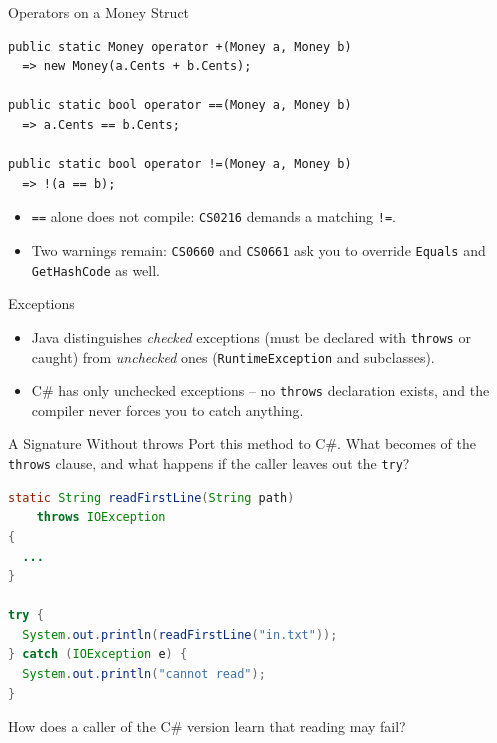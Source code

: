 \begin{solutionframe}{Operators on a Money Struct}
  \begin{lstlisting}[basicstyle=\scriptsize\ttfamily]
public static Money operator +(Money a, Money b)
  => new Money(a.Cents + b.Cents);

public static bool operator ==(Money a, Money b)
  => a.Cents == b.Cents;

public static bool operator !=(Money a, Money b)
  => !(a == b);
  \end{lstlisting}
  \begin{itemize}
    \item \texttt{==} alone does not compile: \texttt{CS0216} demands a matching
      \texttt{!=}.
    \item Two warnings remain: \texttt{CS0660} and \texttt{CS0661} ask you to
      override \texttt{Equals} and \texttt{GetHashCode} as well.
  \end{itemize}
  \vspace{3ex}

\end{solutionframe}

\begin{frame}{Exceptions}
  \begin{itemize}
    \item Java distinguishes \emph{checked} exceptions (must be declared
      with \texttt{throws} or caught) from \emph{unchecked} ones
      (\texttt{RuntimeException} and subclasses).
    \item C\# has only unchecked exceptions -- no \texttt{throws}
      declaration exists, and the compiler never forces you to catch
      anything.
  \end{itemize}
\end{frame}

\begin{exerciseframe}{A Signature Without throws}
  Port this method to C\#. What becomes of the \texttt{throws} clause, and what
  happens if the caller leaves out the \texttt{try}?
  \vspace{1ex}

  \begin{lstlisting}[language=Java,basicstyle=\scriptsize\ttfamily]
static String readFirstLine(String path)
    throws IOException
{
  ...
}

try {
  System.out.println(readFirstLine("in.txt"));
} catch (IOException e) {
  System.out.println("cannot read");
}
  \end{lstlisting}
  \vspace{1ex}

  How does a caller of the C\# version learn that reading may fail?
\end{exerciseframe}

